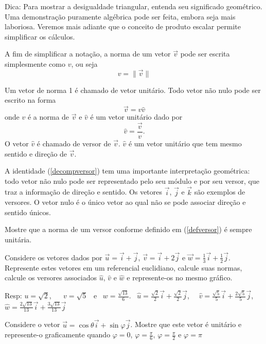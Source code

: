Dica: Para mostrar a desigualdade triangular, entenda seu significado geométrico. Uma demonstração puramente algébrica pode ser feita, embora seja mais laboriosa. Veremos mais adiante que o conceito de produto escalar permite simplificar os cálculos.

A fim de simplificar a notação, a norma de um vetor $\vec{v}$ pode ser escrita simplesmente como $v$, ou seja
$$v=\|\vec{v}\|$$

Um vetor de norma 1 é chamado de vetor unitário. Todo vetor não nulo pode ser escrito na forma
\begin{equation}\label{decompversor}\vec{v}=v \hat{v}\end{equation}
onde $v$ é a norma de $\vec{v}$ e $\hat{v}$ é um vetor unitário dado por
\begin{equation}\label{defversor}\hat{v}=\frac{\vec{v}}{v}.\end{equation}
O vetor $\hat{v}$ é chamado de versor de $\vec{v}$. $\hat{v}$ é um vetor unitário que tem mesmo sentido e direção de $\vec{v}$.

A identidade (\ref{decompversor}) tem uma importante interpretação geométrica: todo vetor não nulo pode ser representado pelo seu módulo e por seu versor, que traz a informação de direção e sentido.  Os vetores $\vec{i}$, $\vec{j}$ e $\vec{k}$ são exemplos de versores. O vetor nulo é o único vetor ao qual não se pode associar direção e sentido únicos.


\begin{exer}Mostre que a norma de um versor conforme definido em (\ref{defversor}) é sempre unitária.
\end{exer}

\begin{exer}\label{ex1uvw} Considere os vetores dados por $\vec{u}=\vec{i}+\vec{j}$, $\vec{v}=\vec{i}+2\vec{j}$ e $\vec{w}=\frac{1}{3}\vec{i}+\frac{1}{2}\vec{j}$. Represente estes vetores em um referencial euclidiano, calcule suas normas, calcule os versores associados $\hat{u}$, $\hat{v}$ e $\hat{w}$ e represente-os no mesmo gráfico.
\end{exer}
Resp: $u=\sqrt{2}$, ~~ $v=\sqrt{5}$ ~e~ $w=\frac{\sqrt{13}}{{6}}$.~ $\hat{u}=\frac{\sqrt{2}}{2}\vec{i}+\frac{\sqrt{2}}{2}\vec{j}$,~~  $\hat{v}=\frac{\sqrt{5}}{5}\vec{i}+\frac{2\sqrt{5}}{5}\vec{j}$,~~ $\hat{w}=\frac{2\sqrt{13}}{13}\vec{i}+\frac{3\sqrt{13}}{13}\vec{j}$

\begin{exer} Considere o vetor $\vec{u}=\cos\theta \vec{i}+ \sin\varphi \vec{j}$. Mostre que este vetor é unitário e represente-o graficamente quando $\varphi=0$, $\varphi=\frac{\pi}{6}$, $\varphi=\frac{\pi}{2}$ e $\varphi={\pi}$
\end{exer}

